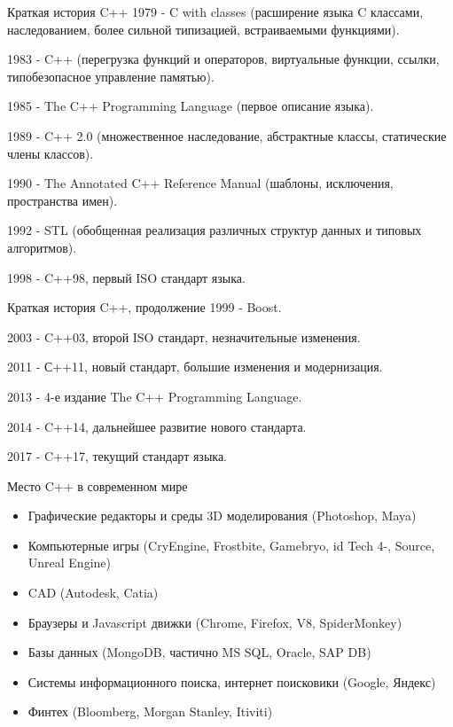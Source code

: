 \documentclass{beamer}
\begin{document}
\begin{frame}{Краткая история C++}
1979 - C with classes (расширение языка C классами, наследованием, более сильной типизацией, встраиваемыми функциями).

1983 - C++ (перегрузка функций и операторов, виртуальные функции, ссылки, типобезопасное управление памятью).

1985 - The C++ Programming Language (первое описание языка).

1989 - C++ 2.0 (множественное наследование, абстрактные классы, статические члены классов).

1990 - The Annotated C++ Reference Manual (шаблоны, исключения, пространства имен).

1992 - STL (обобщенная реализация различных структур данных и типовых алгоритмов).

1998 - C++98, первый ISO стандарт языка.
\end{frame}

\begin{frame}{Краткая история C++, продолжение}
1999 - Boost.

2003 - C++03, второй ISO стандарт, незначительные изменения.

2011 - С++11, новый стандарт, большие изменения и модернизация.

2013 - 4-е издание The C++ Programming Language.

2014 - C++14, дальнейшее развитие нового стандарта.

2017 - C++17, текущий стандарт языка.
\end{frame}

\begin{frame}{Место C++ в современном мире}
\begin{itemize}
  \item Графические редакторы и среды 3D моделирования (Photoshop, Maya)
  \item Компьютерные игры (CryEngine, Frostbite, Gamebryo, id Tech 4-, Source, Unreal Engine)
  \item CAD (Autodesk, Catia)
  \item Браузеры и Javascript движки (Chrome, Firefox, V8, SpiderMonkey)
  \item Базы данных (MongoDB, частично MS SQL, Oracle, SAP DB)
  \item Системы информационного поиска, интернет поисковики (Google, Яндекс)
  \item Финтех (Bloomberg, Morgan Stanley, Itiviti)
\end{itemize}
\end{frame}
\end{document}
